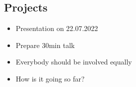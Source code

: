 \subsection{Projects}
\label{subsec:biological-applications-projects}
\begin{frame}{\insertsubsection}
    \begin{itemize}[<+->]
        \item Presentation on 22.07.2022
        \item Prepare 30min talk
        \item Everybody should be involved equally
        \item How is it going so far?
    \end{itemize}
\end{frame}